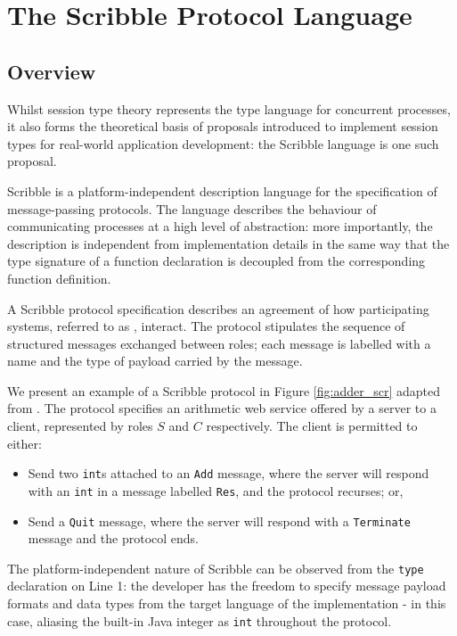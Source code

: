 \section{The Scribble Protocol Language}

\subsection{Overview}
Whilst session type theory represents the type language for concurrent processes, it also forms the theoretical basis of proposals introduced to implement session types for real-world application development: the Scribble language is one such proposal.

Scribble \cite{Scribble} is a platform-independent description language for the specification of message-passing protocols. The language describes the behaviour of communicating processes at a high level of abstraction: more importantly, the description is independent from implementation details in the same way that the type signature of a function declaration is decoupled from the corresponding function definition.

A Scribble protocol specification describes an agreement of how participating systems, referred to as , interact. The protocol stipulates the sequence of structured messages exchanged between roles; each message is labelled with a name and the type of payload carried by the message.

We present an example of a Scribble protocol in Figure \ref{fig:adder_scr} adapted from \cite{Hybrid2016}. The protocol specifies an arithmetic web service offered by a server to a client, represented by roles $S$ and $C$ respectively. The client is permitted to either:

\begin{itemize}
\item Send two \texttt{int}s attached to an \texttt{Add} message, where the server will respond with an \texttt{int} in a message labelled \texttt{Res}, and the protocol recurses; or,
\item Send a \texttt{Quit} message, where the server will respond with a \texttt{Terminate} message and the protocol ends.
\end{itemize}

The platform-independent nature of Scribble can be observed from the \texttt{type} declaration on Line 1: the developer has the freedom to specify message payload formats and data types from the target language of the implementation - in this case, aliasing the built-in Java integer as \texttt{int} throughout the protocol.

